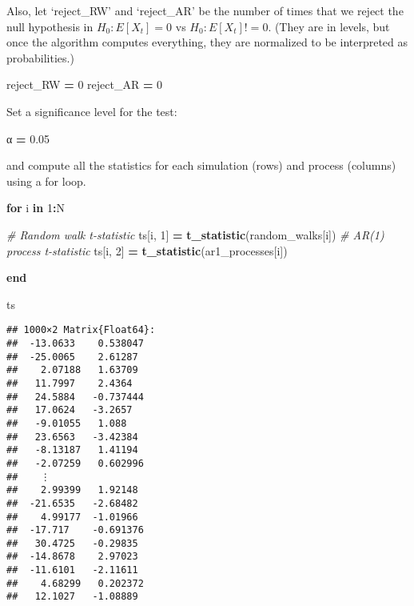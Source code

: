 \documentclass[
]{article}
\newenvironment{Shaded}{\begin{snugshade}}{\end{snugshade}}
\newcommand{\CommentTok}[1]{\textcolor[rgb]{0.56,0.35,0.01}{\textit{#1}}}
\newcommand{\ControlFlowTok}[1]{\textcolor[rgb]{0.13,0.29,0.53}{\textbf{#1}}}
\newcommand{\FloatTok}[1]{\textcolor[rgb]{0.00,0.00,0.81}{#1}}
\newcommand{\FunctionTok}[1]{\textcolor[rgb]{0.13,0.29,0.53}{\textbf{#1}}}
\newcommand{\KeywordTok}[1]{\textcolor[rgb]{0.13,0.29,0.53}{\textbf{#1}}}
\newcommand{\NormalTok}[1]{#1}
\newcommand{\OperatorTok}[1]{\textcolor[rgb]{0.81,0.36,0.00}{\textbf{#1}}}
\begin{document}
Also, let `reject\_RW' and `reject\_AR' be the number of times that we
reject the null hypothesis in \(H_0: E[X_t] = 0\) vs
\(H_0: E[X_t] != 0\). (They are in levels, but once the algorithm
computes everything, they are normalized to be interpreted as
probabilities.)

\begin{Shaded}
\begin{Highlighting}[]
\NormalTok{reject\_RW }\OperatorTok{=} \FloatTok{0}
\NormalTok{reject\_AR }\OperatorTok{=} \FloatTok{0}
\end{Highlighting}
\end{Shaded}

Set a significance level for the test:

\begin{Shaded}
\begin{Highlighting}[]
\NormalTok{α }\OperatorTok{=} \FloatTok{0.05}
\end{Highlighting}
\end{Shaded}

and compute all the statistics for each simulation (rows) and process
(columns) using a for loop.

\begin{Shaded}
\begin{Highlighting}[]
\ControlFlowTok{for}\NormalTok{ i }\KeywordTok{in} \FloatTok{1}\OperatorTok{:}\NormalTok{N}

    \CommentTok{\# Random walk t{-}statistic}
\NormalTok{    ts[i, }\FloatTok{1}\NormalTok{] }\OperatorTok{=} \FunctionTok{t\_statistic}\NormalTok{(random\_walks[i])}
    \CommentTok{\# AR(1) process t{-}statistic}
\NormalTok{    ts[i, }\FloatTok{2}\NormalTok{] }\OperatorTok{=} \FunctionTok{t\_statistic}\NormalTok{(ar1\_processes[i])}
    
\ControlFlowTok{end}
   
\NormalTok{ts }
\end{Highlighting}
\end{Shaded}

\begin{verbatim}
## 1000×2 Matrix{Float64}:
##  -13.0633    0.538047
##  -25.0065    2.61287
##    2.07188   1.63709
##   11.7997    2.4364
##   24.5884   -0.737444
##   17.0624   -3.2657
##   -9.01055   1.088
##   23.6563   -3.42384
##   -8.13187   1.41194
##   -2.07259   0.602996
##    ⋮        
##    2.99399   1.92148
##  -21.6535   -2.68482
##    4.99177  -1.01966
##  -17.717    -0.691376
##   30.4725   -0.29835
##  -14.8678    2.97023
##  -11.6101   -2.11611
##    4.68299   0.202372
##   12.1027   -1.08889
\end{verbatim}
\end{document}
